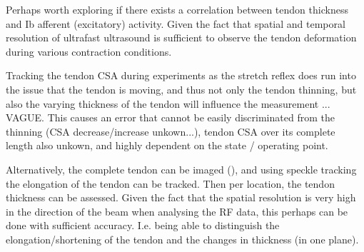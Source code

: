 Perhaps worth exploring if there exists a correlation between tendon thickness and Ib afferent (excitatory) activity. Given the fact that spatial and temporal resolution of ultrafast ultrasound is sufficient to observe the tendon deformation during various contraction conditions. 

Tracking the tendon CSA during experiments as the stretch reflex does run into the issue that the tendon is moving, and thus not only the tendon thinning, but also the varying thickness of the tendon will influence the measurement ... VAGUE. This causes an error that cannot be easily discriminated from the thinning (CSA decrease/increase unkown...), tendon CSA over its complete length also unkown, and highly dependent on the state / operating point.

Alternatively, the complete tendon can be imaged (), and using speckle tracking the elongation of the tendon can be tracked. Then per location, the tendon thickness can be assessed. Given the fact that the spatial resolution is very high in the direction of the beam when analysing the RF data, this perhaps can be done with sufficient accuracy. I.e. being able to distinguish the elongation/shortening of the tendon and the changes in thickness (in one plane).





